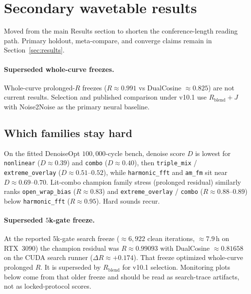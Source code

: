 \section{Secondary wavetable results}
\label{app:secondary-results}

Moved from the main Results section to shorten the conference-length reading path.
Primary holdout, meta-compare, and converge claims remain in Section~\ref{sec:results}.

\paragraph{Superseded whole-curve freezes.}
Whole-curve prolonged-$R$ freezes ($R{\approx}0.991$ vs DualCosine ${\approx}0.825$) are not current results.
Selection and published comparison under v10.1 use $R_{\mathrm{blend}}{+}J$ with Noise2Noise as the primary neural baseline.

\subsection{Which families stay hard}
\label{sec:family-hardness}
On the fitted DenoiseOpt $100{,}000$-cycle bench, denoise score $D$ is lowest for \texttt{nonlinear} ($D\approx 0.39$) and \texttt{combo} ($D\approx 0.40$), then \texttt{triple\_mix} / \texttt{extreme\_overlay} ($D\approx 0.51$--$0.52$), while \texttt{harmonic\_fft} and \texttt{am\_fm} sit near $D\approx 0.69$--$0.70$.
Lit-combo champion family stress (prolonged residual) similarly ranks \texttt{open\_wrap\_bias} ($R\approx 0.83$) and \texttt{extreme\_overlay} / \texttt{combo} ($R\approx 0.88$--$0.89$) below \texttt{harmonic\_fft} ($R\approx 0.95$).
Hard sounds recur.

\paragraph{Superseded $5$k-gate freeze.}
At the reported $5$k-gate search freeze ($\approx 6{,}922$ clean iterations, $\approx 7.9$\,h on RTX~3090) the champion residual was $R\approx 0.99093$ with DualCosine $\approx 0.81658$ on the CUDA search runner ($\Delta R\approx{+}0.174$).
That freeze optimized whole-curve prolonged $R$.
It is superseded by $R_{\mathrm{blend}}$ for v10.1 selection.
Monitoring plots below come from that older freeze and should be read as search-trace artifacts, not as locked-protocol scores.

